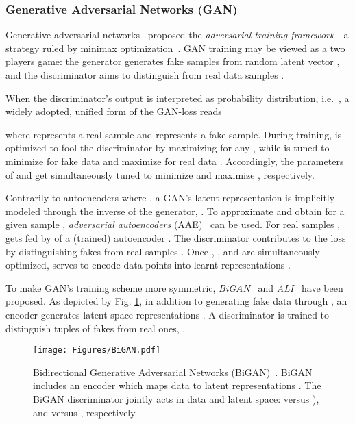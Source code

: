 \documentclass[lettersize,journal]{IEEEtran}
\begin{document}
\subsubsection{Generative Adversarial Networks (GAN)}


Generative adversarial networks~\cite{goodfellow2014generative,radford2015unsupervised} proposed the \textit{adversarial training framework}---a strategy ruled by minimax optimization~\cite{bertsimas2013robust}. GAN training may be viewed as a two players game: the generator  generates fake samples  from random latent vector , and the discriminator  aims to distinguish  from real data samples . 

When the discriminator's output is interpreted as probability distribution, i.e.\ , a widely adopted, unified form of the GAN-loss reads

where  represents a real sample and  represents a fake sample. During training,  is optimized to fool the discriminator by maximizing  for any , while  is tuned to minimize  for fake data  and maximize  for real data . Accordingly, the parameters of  and  get simultaneously tuned to minimize and maximize , respectively.

Contrarily to autoencoders where , a GAN’s latent representation  is implicitly modeled through the inverse of the generator, . To approximate  and obtain  for a given sample , \textit{adversarial autoencoders} (AAE)~\cite{makhzani2015adversarial} can be used. For real samples ,  gets fed by  of a (trained) autoencoder . The discriminator contributes to the loss by distinguishing fakes  from real samples . Once , , and  are simultaneously optimized,  serves to encode data points  into learnt representations .

To make GAN's training scheme more symmetric, \textit{BiGAN}~\cite{donahue2016adversarial,donahue2019large} and \textit{ALI}~\cite{dumoulin2016adversarially} have been proposed. As depicted by Fig. \ref{fig:BiGAN}, in addition to generating fake data  through , an encoder  generates latent space representations . A discriminator  is trained to distinguish tuples of fakes  from real ones, .

\begin{figure}
\centering
\texttt{[image: Figures/BiGAN.pdf]}
\caption[BiGAN]{Bidirectional Generative Adversarial Networks (BiGAN)~\cite{donahue2016adversarial}. BiGAN includes an encoder  which maps data  to latent representations . The BiGAN discriminator  jointly acts in data and latent space:  versus ), and  versus , respectively.}
\label{fig:BiGAN}
\end{figure}
\end{document}
